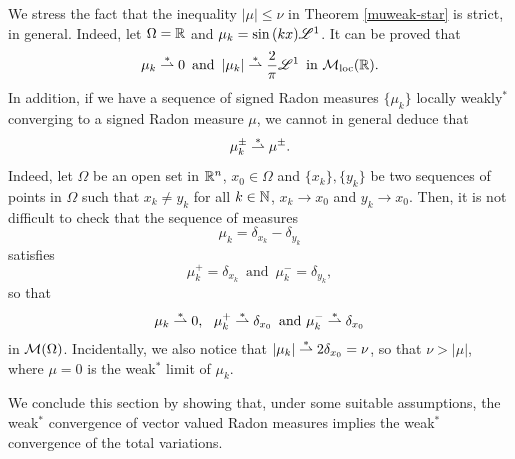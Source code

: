\begin{remark}
We stress the fact that the inequality $|\mu| \le \nu$ in Theorem \ref{muweak-star} is strict, in general. Indeed, let $\Omega = \mathbb{R}$ and $\mu_{k} = \sin{(kx)} \mathscr{L}^{1}$. It can be proved that 
\begin{equation*}
\mu_{k} \overset{*}{\rightharpoonup} 0 \, \text{ and } \, |\mu_{k}| \overset{*}{\rightharpoonup} \frac{2}{\pi} \mathscr{L}^{1} \, \text{ in } \mathcal{M}_{\rm loc}(\mathbb{R}).
\end{equation*}
In addition, if we have a sequence of signed Radon measures $\{\mu_{k}\}$ locally weakly$^{*}$ converging to a signed Radon measure $\mu$, we cannot in general deduce that
\begin{equation*}
\mu_{k}^{\pm} \overset{*}{\rightharpoonup} \mu^{\pm}.
\end{equation*}
Indeed, let $\Omega$ be an open set in $\mathbb{R}^{n}$, $x_{0} \in \Omega$ and $\{x_{k}\}, \{y_{k}\}$ be two sequences of points in $\Omega$ such that $x_{k} \neq y_{k}$ for all $k \in \mathbb{N}$, $x_{k} \to x_{0}$ and $y_{k} \to x_{0}$. Then, it is not difficult to check that the sequence of measures
\begin{equation*}
\mu_{k} = \delta_{x_{k}} - \delta_{y_{k}}
\end{equation*}
satisfies
\begin{equation*}
\mu_{k}^{+} = \delta_{x_{k}} \, \text{ and } \, \mu_{k}^{-} = \delta_{y_{k}},
\end{equation*}
so that
\begin{align*}
\mu_{k} \overset{*}{\rightharpoonup} 0, \ \ \mu_{k}^{+} \overset{*}{\rightharpoonup} \delta_{x_{0}} \, \text{ and } \mu_{k}^{-} \overset{*}{\rightharpoonup} \delta_{x_{0}}
\end{align*}
in $\mathcal{M}(\Omega)$.
Incidentally, we also notice that $|\mu_{k}| \overset{*}{\rightharpoonup} 2 \delta_{x_{0}} = \nu$, so that $\nu > |\mu|$, where $\mu = 0$ is the weak$^*$ limit of $\mu_{k}$.
\end{remark}

We conclude this section by showing that, under some suitable assumptions, the weak$^{*}$ convergence of vector valued Radon measures implies the weak$^{*}$ convergence of the total variations.

